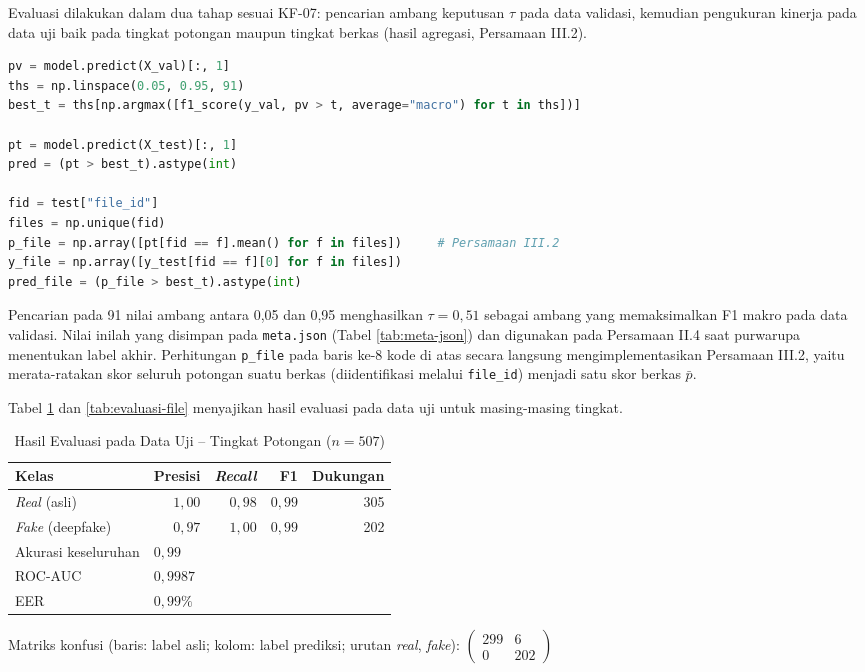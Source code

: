 Evaluasi dilakukan dalam dua tahap sesuai KF-07: pencarian ambang keputusan $\tau$
pada data validasi, kemudian pengukuran kinerja pada data uji baik pada tingkat
potongan maupun tingkat berkas (hasil agregasi, Persamaan III.2).

\begin{lstlisting}[language=Python, caption={Pencarian ambang keputusan dan evaluasi model}, label={lst:evaluasi}]
pv = model.predict(X_val)[:, 1]
ths = np.linspace(0.05, 0.95, 91)
best_t = ths[np.argmax([f1_score(y_val, pv > t, average="macro") for t in ths])]

pt = model.predict(X_test)[:, 1]
pred = (pt > best_t).astype(int)

fid = test["file_id"]
files = np.unique(fid)
p_file = np.array([pt[fid == f].mean() for f in files])     # Persamaan III.2
y_file = np.array([y_test[fid == f][0] for f in files])
pred_file = (p_file > best_t).astype(int)
\end{lstlisting}

Pencarian pada 91 nilai ambang antara 0,05 dan 0,95 menghasilkan $\tau=0{,}51$
sebagai ambang yang memaksimalkan F1 makro pada data validasi. Nilai inilah yang
disimpan pada \texttt{meta.json} (Tabel \ref{tab:meta-json}) dan digunakan pada
Persamaan II.4 saat purwarupa menentukan label akhir. Perhitungan \texttt{p\_file}
pada baris ke-8 kode di atas secara langsung mengimplementasikan Persamaan III.2,
yaitu merata-ratakan skor seluruh potongan suatu berkas (diidentifikasi melalui
\texttt{file\_id}) menjadi satu skor berkas $\bar{p}$.



Tabel \ref{tab:evaluasi-chunk} dan \ref{tab:evaluasi-file} menyajikan hasil evaluasi
pada data uji untuk masing-masing tingkat.

\begin{table}[htbp]
  \centering
  \caption{Hasil Evaluasi pada Data Uji -- Tingkat Potongan ($n=507$)}
  \label{tab:evaluasi-chunk}
  \begin{tabular}{@{}lrrrr@{}}
    \toprule
    \textbf{Kelas} & \textbf{Presisi} & \textbf{\textit{Recall}} & \textbf{F1} & \textbf{Dukungan} \\
    \midrule
    \textit{Real} (asli) & $1{,}00$ & $0{,}98$ & $0{,}99$ & 305 \\
    \textit{Fake} (deepfake) & $0{,}97$ & $1{,}00$ & $0{,}99$ & 202 \\
    \midrule
    Akurasi keseluruhan & \multicolumn{4}{l}{$0{,}99$} \\
    ROC-AUC & \multicolumn{4}{l}{$0{,}9987$} \\
    EER & \multicolumn{4}{l}{$0{,}99\%$} \\
    \bottomrule
  \end{tabular}

  \vspace{2mm}
  \small Matriks konfusi (baris: label asli; kolom: label prediksi; urutan \textit{real}, \textit{fake}):
  $\begin{pmatrix} 299 & 6 \\ 0 & 202 \end{pmatrix}$
\end{table}

